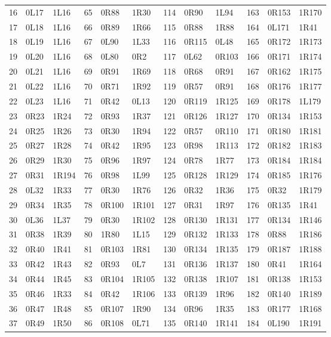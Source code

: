 \begin{longtable}{rll@{\hspace{1.3em}}rll@{\hspace{1.3em}}rll@{\hspace{1.3em}}rll}
16 & 0L17 & 1L16 & 65 & 0R88 & 1R30 & 114 & 0R90 & 1L94 & 163 & 0R153 & 1R170\\
17 & 0L18 & 1L16 & 66 & 0R89 & 1R66 & 115 & 0R88 & 1R88 & 164 & 0L171 & 1R41\\
18 & 0L19 & 1L16 & 67 & 0L90 & 1L33 & 116 & 0R115 & 0L48 & 165 & 0R172 & 1R173\\
19 & 0L20 & 1L16 & 68 & 0L80 & 0R2 & 117 & 0L62 & 0R103 & 166 & 0R171 & 1R174\\
20 & 0L21 & 1L16 & 69 & 0R91 & 1R69 & 118 & 0R68 & 0R91 & 167 & 0R162 & 1R175\\
21 & 0L22 & 1L16 & 70 & 0R71 & 1R92 & 119 & 0R57 & 0R91 & 168 & 0R176 & 1R177\\
22 & 0L23 & 1L16 & 71 & 0R42 & 0L13 & 120 & 0R119 & 1R125 & 169 & 0R178 & 1L179\\
23 & 0R23 & 1R24 & 72 & 0R93 & 1R37 & 121 & 0R126 & 1R127 & 170 & 0R134 & 1R153\\
24 & 0R25 & 1R26 & 73 & 0R30 & 1R94 & 122 & 0R57 & 0R110 & 171 & 0R180 & 1R181\\
25 & 0R27 & 1R28 & 74 & 0R42 & 1R95 & 123 & 0R98 & 1R113 & 172 & 0R182 & 1R183\\
26 & 0R29 & 1R30 & 75 & 0R96 & 1R97 & 124 & 0R78 & 1R77 & 173 & 0R184 & 1R184\\
27 & 0R31 & 1R194 & 76 & 0R98 & 1L99 & 125 & 0R128 & 1R129 & 174 & 0R185 & 1R176\\
28 & 0L32 & 1R33 & 77 & 0R30 & 1R76 & 126 & 0R32 & 1R36 & 175 & 0R32 & 1R179\\
29 & 0R34 & 1R35 & 78 & 0R100 & 1R101 & 127 & 0R31 & 1R97 & 176 & 0R135 & 1R41\\
30 & 0L36 & 1L37 & 79 & 0R30 & 1R102 & 128 & 0R130 & 1R131 & 177 & 0R134 & 1R146\\
31 & 0R38 & 1R39 & 80 & 1R80 & 1L15 & 129 & 0R132 & 1R133 & 178 & 0R88 & 1R186\\
32 & 0R40 & 1R41 & 81 & 0R103 & 1R81 & 130 & 0R134 & 1R135 & 179 & 0R187 & 1R188\\
33 & 0R42 & 1R43 & 82 & 0R93 & 0L7 & 131 & 0R136 & 1R137 & 180 & 0R41 & 1R164\\
34 & 0R44 & 1R45 & 83 & 0R104 & 1R105 & 132 & 0R138 & 1R107 & 181 & 0R138 & 1R153\\
35 & 0R46 & 1R33 & 84 & 0R42 & 1R106 & 133 & 0R139 & 1R96 & 182 & 0R140 & 1R189\\
36 & 0R47 & 1R48 & 85 & 0R107 & 1R90 & 134 & 0R96 & 1R35 & 183 & 0R177 & 1R168\\
37 & 0R49 & 1R50 & 86 & 0R108 & 0L71 & 135 & 0R140 & 1R141 & 184 & 0L190 & 1R191\\

\end{longtable}
